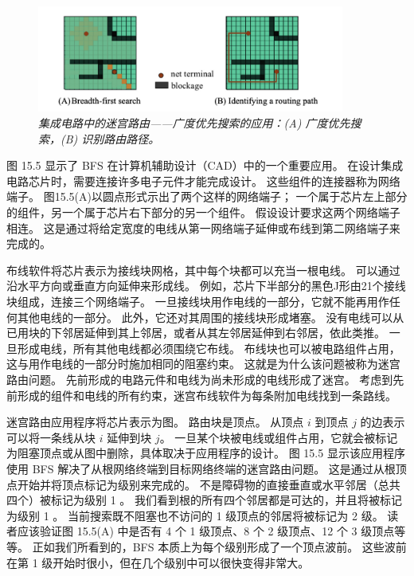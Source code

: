 \begin{figure}[H]
	\centering
	\includegraphics[width=0.9\textwidth]{figs/F15.5.png}
	\caption{\textit{集成电路中的迷宫路由——广度优先搜索的应用：(A) 广度优先搜索，(B) 识别路由路径。}}
\end{figure}

图 15.5 显示了 BFS 在计算机辅助设计（CAD）中的一个重要应用。 在设计集成电路芯片时，需要连接许多电子元件才能完成设计。 
这些组件的连接器称为网络端子。 图15.5(A)以圆点形式示出了两个这样的网络端子； 
一个属于芯片左上部分的组件，另一个属于芯片右下部分的另一个组件。 假设设计要求这两个网络端子相连。 
这是通过将给定宽度的电线从第一网络端子延伸或布线到第二网络端子来完成的。

布线软件将芯片表示为接线块网格，其中每个块都可以充当一根电线。 可以通过沿水平方向或垂直方向延伸来形成线。 
例如，芯片下半部分的黑色J形由21个接线块组成，连接三个网络端子。 
一旦接线块用作电线的一部分，它就不能再用作任何其他电线的一部分。 此外，它还对其周围的接线块形成堵塞。 
没有电线可以从已用块的下邻居延伸到其上邻居，或者从其左邻居延伸到右邻居，依此类推。 
一旦形成电线，所有其他电线都必须围绕它布线。 布线块也可以被电路组件占用，这与用作电线的一部分时施加相同的阻塞约束。 
这就是为什么该问题被称为迷宫路由问题。 先前形成的电路元件和电线为尚未形成的电线形成了迷宫。 
考虑到先前形成的组件和电线的所有约束，迷宫布线软件为每条附加电线找到一条路线。

迷宫路由应用程序将芯片表示为图。 路由块是顶点。 从顶点 $i$ 到顶点 $j$ 的边表示可以将一条线从块 $i$ 延伸到块 $j$。 
一旦某个块被电线或组件占用，它就会被标记为阻塞顶点或从图中删除，具体取决于应用程序的设计。 
图 15.5 显示该应用程序使用 BFS 解决了从根网络终端到目标网络终端的迷宫路由问题。 
这是通过从根顶点开始并将顶点标记为级别来完成的。 不是障碍物的直接垂直或水平邻居（总共四个）被标记为级别 1 。 
我们看到根的所有四个邻居都是可达的，并且将被标记为级别 1 。 当前搜索既不阻塞也不访问的 1 级顶点的邻居将被标记为 2 级。 
读者应该验证图 15.5(A) 中是否有 4 个 1 级顶点、8 个 2 级顶点、12 个 3 级顶点等等。 
正如我们所看到的，BFS 本质上为每个级别形成了一个顶点波前。 这些波前在第 1 级开始时很小，但在几个级别中可以很快变得非常大。

